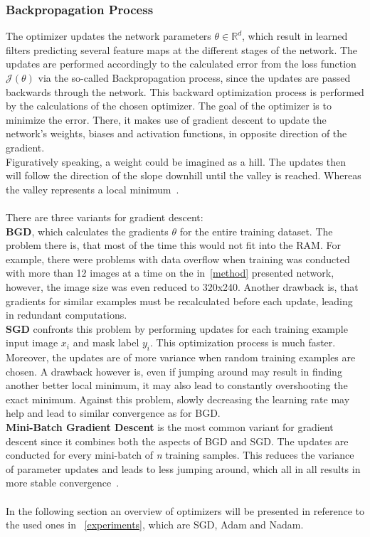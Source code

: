\subsubsection{Backpropagation Process}
The optimizer updates the network parameters $\theta \in \mathbb{R}^d$, which result in learned filters predicting several feature maps at
the different stages of the network.
The updates are performed accordingly to the calculated error from the loss function $\mathcal{J}(\theta)$ via the
so-called Backpropagation process, since the updates are passed backwards through the network.
This backward optimization process is performed by the calculations of the chosen optimizer.
The goal of the optimizer is to minimize the error.
There, it makes use of gradient descent to update the network's weights, biases and activation functions, in opposite direction
of the gradient.\\
Figuratively speaking, a weight could be imagined as a hill.
The updates then will follow the direction of the slope downhill until the valley is reached.
Whereas the valley represents a local minimum~\cite{optimizersoverview}.
\\\mbox{}\\
There are three variants for gradient descent:\\
\textbf{\gls{BGD}}, which calculates the gradients $\theta$ for the entire training dataset.
The problem there is, that most of the time this would not fit into the RAM.
For example, there were problems with data overflow when training was conducted with more than 12 images
at a time on the in~\autoref{method} presented network, however, the image size was even reduced
to 320x240.
Another drawback is, that gradients for similar examples must be recalculated before each update, leading in redundant computations.\\
\textbf{\gls{SGD}} confronts this problem by performing updates for each training example input image $x_i$
and mask label $y_i$.
This optimization process is much faster.
Moreover, the updates are of more variance when random training examples are chosen.
A drawback however is, even if jumping around may result in finding another better local minimum, it may also
lead to constantly overshooting the exact minimum.
Against this problem, slowly decreasing the learning rate may help and lead to similar convergence as for BGD.\\
\textbf{Mini-Batch Gradient Descent} is the most common variant for gradient descent since it combines both the aspects of
\gls{BGD} and \gls{SGD}.
The updates are conducted for every mini-batch of \textit{n} training samples.
This reduces the variance of parameter updates and leads to less jumping around, which all in all results in more stable
convergence~\cite{optimizersoverview}.
\\\mbox{}\\
In the following section an overview of optimizers will be presented in reference to the used ones in ~\autoref{experiments}, which are
\gls{SGD}, \gls{Adam} and \gls{Nadam}.


